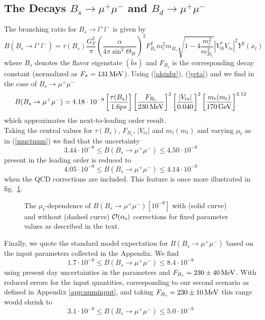 \subsection{The Decays $B_{s}\to\mu^+\mu^-$ and $B_{d}\to\mu^+\mu^-$}
\label{sec:BXnnBmm:Bmm}
The branching ratio for $B_s\to l^+l^-$ is given by \cite{buchallaburas:93b}
\begin{equation}\label{bbll}
B(B_s\to l^+l^-)=\tau(B_s)\frac{G^2_F}{\pi}
\left(\frac{\alpha}{4\pi\sin^2\Theta_W}\right)^2 F^2_{B_s}m^2_l m_{B_s}
\sqrt{1-4\frac{m^2_l}{m^2_{B_s}}} |V^\ast_{tb}V_{ts}|^2 Y^2(x_t)
\end{equation}
where $B_s$ denotes the flavor eigenstate $(\bar bs)$ and $F_{B_s}$ is
the corresponding decay constant (normalized as $F_\pi=131\, {\rm MeV}$). Using
(\ref{alsinbr}), (\ref{yeta}) and  we find in the
case of $B_s\to\mu^+\mu^-$
\begin{equation}\label{bbmmnum}
B(B_s\to\mu^+\mu^-)=4.18\cdot 10^{-9}\left[\frac{\tau(B_s)}{1.6 ps}\right]
\left[\frac{F_{B_s}}{230\, {\rm MeV}}\right]^2 
\left[\frac{|V_{ts}|}{0.040}\right]^2 
\left[\frac{m_t(m_t)}{170\, {\rm GeV}}\right]^{3.12}
\end{equation}
which approximates the next-to-leading order result.
\\
Taking the central values for $\tau(B_s)$, $F_{B_s}$, $|V_{ts}|$ and
$m_t(m_t)$ and varying $\mu_t$ as in (\ref{muctnum}) we find that the
uncertainty
\begin{equation}\label{lobmm}
3.44\cdot 10^{-9}\leq B(B_s\to\mu^+\mu^-)\leq 4.50\cdot 10^{-9}
\end{equation}
present in the leading order is reduced to
\begin{equation}\label{nlobmm}
4.05\cdot 10^{-9}\leq B(B_s\to\mu^+\mu^-)\leq 4.14\cdot 10^{-9}
\end{equation}
when the QCD corrections are included.
This feature is once more illustrated in fig.\ \ref{fig:bmmmut}.

\begin{figure}[hbt]
\vspace{0.10in}
\centerline{
\epsfysize=5in
 }
\vspace{0.08in}
\caption[]{
The $\mu_t$-dependence of $B(B_s \to \mu^+\mu^-) [10^{-9}]$
with (solid curve) and without (dashed curve) ${\cal O}(\alpha_{\rm s})$
corrections for fixed parameter values as described in the text.
\label{fig:bmmmut}}
\end{figure}

Finally, we quote the standard model expectation 
for $B(B_s\to\mu^+\mu^-)$ based on the
input parameters collected in the Appendix. We find
\begin{equation}\label{bsmm1}
1.7\cdot 10^{-9}\leq B(B_s\to\mu^+\mu^-)\leq 8.4\cdot 10^{-9}
\end{equation}
using present day uncertainties in the parameters and
$F_{B_s}=230\pm 40\, {\rm MeV}$. With reduced errors for the input
quantities, corresponding to our second scenario as defined in 
Appendix \ref{app:numinput}, 
and taking $F_{B_s}=230\pm 10\, {\rm MeV}$ this range would
shrink to
\begin{equation}\label{bsmm2}
3.1\cdot 10^{-9}\leq B(B_s\to\mu^+\mu^-)\leq 5.0\cdot 10^{-9}
\end{equation}

